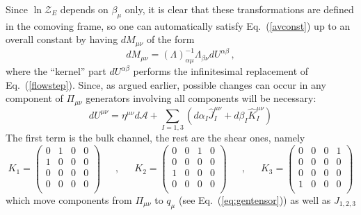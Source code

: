 \documentclass[12pt,onecolumn,showpacs,amssymb,aps,nofootinbib,floatfix]{revtex4-2}
\renewcommand{\eqref}[1]{Eq.~(\ref{#1})}
\newcommand{\eqcomma}{\phantom{AA},\phantom{AA}}
\newcommand{\lnz}{\ln \mathcal{Z}}
\begin{document}
	Since $\lnz_E$ depends on $\beta_\mu$ only, it is clear that these transformations are defined in the comoving frame, so one can automatically satisfy \eqref{avconst} up to an overall constant by having $dM_{\mu \nu}$ of the form
	\begin{equation}
		\label{element1}
		dM_{\mu \nu} = \left(\Lambda \right)^{-1}_{\alpha \mu} \Lambda_{\beta \nu} dU^{\alpha \beta}\,,  
	\end{equation}
\color{black}
where the ``kernel'' part 
$dU^{\alpha \beta}$ performs the infinitesimal replacement of \eqref{flowstep}.  Since, as argued earlier, possible changes can occur in any component of $\Pi_{\mu \nu}$ generators involving all components will be necessary:
	\begin{equation}
		\label{element2}
		dU^{\mu \nu} = \eta^{\mu \nu} d\mathcal{A}+ \sum_{I=1,3} \left( d\alpha_I \hat{J}^{\mu \nu}_I + d\beta_I \hat{K}^{\mu \nu}_I \right)
	\end{equation}
	The first term is the bulk channel, the rest are the shear ones, namely
	\begin{equation}
		\label{kproj}
		K_1 = \left(
		\begin{array}{cccc}
			0 & 1 & 0 & 0\\
			1 & 0 & 0 & 0\\
			0 & 0 & 0 & 0\\
			0 & 0 & 0 & 0\\
		\end{array}
		\right) \eqcomma K_2=  \left(
		\begin{array}{cccc}
			0 & 0 & 1 & 0\\
			0 & 0 & 0 & 0\\
			1 & 0 & 0 & 0\\
			0 & 0 & 0 & 0\\
		\end{array}
		\right) \eqcomma K_3=  \left(
		\begin{array}{cccc}
			0 & 0 & 0 & 1\\
			0 & 0 & 0 & 0\\
			0 & 0 & 0 & 0\\
			1 & 0 & 0 & 0\\
		\end{array}
		\right)  \end{equation}
	which move components from $\Pi_{\mu \nu}$ to $q_\mu$ (see \eqref{eq:gentensor})  as well as $J_{1,2,3}$
\end{document}

